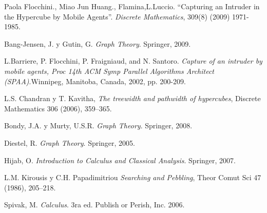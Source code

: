 

\begin{thebibliography}{99}

 \label{Articulo}
Paola Flocchini., Miao Jun Huang., Flamina,L.Luccio. ``Capturing an Intruder in the Hypercube by Mobile Agents''. \emph{Discrete Mathematics}, 309(8) (2009) 1971-1985.
 
  \label{Bang}
Bang-Jensen, J. y Gutin, G. \emph{Graph Theory}. Springer, 2009.

 \label{Berlekamp}
L.Barriere, P. Flocchini, P. Fraigniaud, and N. Santoro. \emph{Capture of an intruder by mobile agents, Proc 14th ACM Symp Parallel Algorithms Architect (SPAA)}.Winnipeg, Manitoba, Canada, 2002, pp. 200-209.

L.S. Chandran y T. Kavitha, \emph{The treewidth and pathwidth of hypercubes}, Discrete Mathematics 306 (2006), 359--365.

 \label{Bondy}
Bondy, J.A.  y  Murty, U.S.R. \emph{Graph Theory}. Springer, 2008.

 \label{Diestel}
Diestel, R. \emph{Graph Theory}. Springer, 2005.

  \label{Hilab}
Hijab, O. \emph{Introduction to Calculus and Classical Analysis}. Springer, 2007.

L.M. Kirousis y C.H. Papadimitriou \emph{Searching and Pebbling}, Theor Comut Sci 47 (1986), 205--218.

  \label{Spivak}
Spivak, M. \emph{Calculus}. 3ra ed. Publish or Perish, Inc. 2006.

\end{thebibliography}

\newpage
\mbox{}

